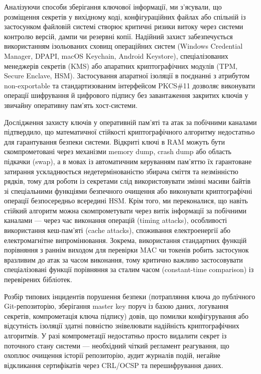 \documentclass[12pt,a4paper]{article}
\begin{document}
Аналізуючи способи зберігання ключової інформації, ми з'ясували, що розміщення секретів у вихідному коді,
конфігураційних файлах або спільній із застосунком файловій системі створює критичні ризики витоку через
системи контролю версій, дампи чи резервні копії. Надійний захист забезпечується використанням
ізольованих сховищ операційних систем (Windows Credential Manager, DPAPI, macOS Keychain, Android
Keystore), спеціалізованих менеджерів секретів (KMS) або апаратних криптографічних модулів (TPM, Secure
Enclave, HSM). Застосування апаратної ізоляції в поєднанні з атрибутом non-exportable та стандартизованим
інтерфейсом PKCS\#11 дозволяє виконувати операції шифрування й цифрового підпису без завантаження
закритих ключів у звичайну оперативну пам'ять хост-системи.

Дослідження захисту ключів у оперативній пам'яті та атак за побічними каналами підтвердило, що
математичної стійкості криптографічного алгоритму недостатньо для гарантування безпеки системи. Відкриті
ключі в RAM можуть бути скомпрометовані через механізми memory dump, crash dump або область підкачки
(swap), а в мовах із автоматичним керуванням пам'яттю їх гарантоване затирання ускладнюється
недетермінованістю збирача сміття та незмінністю рядків, тому для роботи із секретами слід використовувати
змінні масиви байтів зі спеціальними функціями безпечного очищення або виконувати криптографічні
операції безпосередньо всередині HSM. Крім того, ми переконалися, що навіть стійкий алгоритм можна
скомпрометувати через витік інформації за побічними каналами --- через час виконання операцій (timing
attacks), особливості використання кеш-пам'яті (cache attacks), споживання електроенергії або
електромагнітне випромінювання. Зокрема, використання стандартних функцій порівняння з раннім виходом
для перевірки MAC чи токенів робить застосунок вразливим до атак за часом виконання, тому критично
важливо застосовувати спеціалізовані функції порівняння за сталим часом (constant-time comparison) із
перевірених бібліотек.

Розбір типових інцидентів порушення безпеки (потрапляння ключа до публічного Git-репозиторію,
зберігання master key поруч із базою даних, логування секретів, компрометація ключа підпису) довів, що
помилки конфігурування або відсутність ізоляції здатні повністю знівелювати надійність криптографічних
алгоритмів. У разі компрометації недостатньо просто видалити секрет із поточного стану системи ---
необхідний чіткий регламент реагування, що охоплює очищення історії репозиторію, аудит журналів подій,
негайне відкликання сертифікатів через CRL/OCSP та перешифрування даних.
\end{document}
